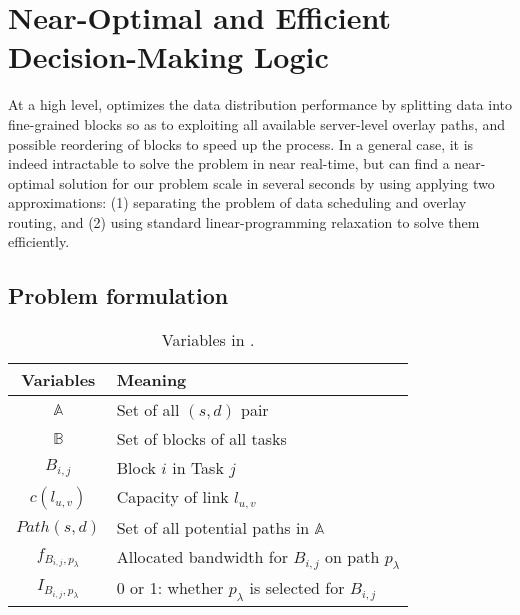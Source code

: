\section{Near-Optimal and Efficient Decision-Making Logic}

At a high level, \name optimizes the data distribution performance by splitting data into fine-grained blocks so as to exploiting all available server-level overlay paths, and possible reordering of blocks to speed up the process.
In a general case, it is indeed intractable to solve the problem in near real-time, but \name can find a near-optimal solution for our problem scale in several seconds by using applying two approximations: (1) separating the problem of data scheduling and overlay routing, and (2) using standard linear-programming relaxation to solve them efficiently.


\subsection{Problem formulation}
\begin{table}[t]
\begin{center}
\begin{tabular}{| c | l|}
\hline
 \rowcolor[gray]{0.9}
\textbf{Variables} & \textbf{Meaning} \\
\hline \hline
\textit{$\mathbb{A}$} & Set of all $(s, d)$ pair\\
\hline
\textit{$\mathbb{B}$} & Set of blocks of all tasks\\
\hline
\textit{$B_{i,j}$} & Block $i$ in Task $j$\\
\hline
\textit{$c(l_{u,v})$} & Capacity of link $l_{u,v}$\\
\hline
\textit{$Path(s,d)$} & Set of all potential paths in $\mathbb{A}$\\
\hline
\textit{$f_{B_{i,j},p_\lambda}$} & Allocated bandwidth for $B_{i,j}$ on path $p_\lambda$\\
\hline
\textit{$I_{B_{i,j},p_\lambda}$} & 0 or 1: whether $p_\lambda$ is selected for $B_{i,j}$\\
\hline
\end{tabular}
\end{center}
\caption{Variables in \name.}
\label{table:para}
\end{table}

